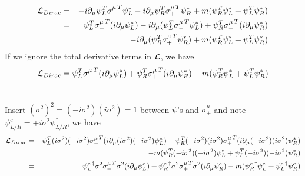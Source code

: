 \documentclass[11pt]{article}
\def\del{{\partial}}
\begin{document}
\section{ }

\begin{eqnarray}
    {\cal L}_{Dirac} &=& - i\del_\mu \psi_L^T{\sigma_-^\mu}^T \psi_L^*
    - i\del_\mu \psi_R^T {\sigma_+^\mu}^T \psi_R^*
    + m( \psi_R^T \psi_L^* + \psi_L^T \psi_R^* )  \\
    &=& \psi_L^T{\sigma_-^\mu}^T( i\del_\mu \psi_L^*) - i\del_\mu (\psi_L^T{\sigma_-^\mu}^T \psi_L^*)+  \psi_R^T {\sigma_+^\mu}^T(i\del_\mu \psi_R^*)\nonumber \\ &&- i\del_\mu (\psi_R^T {\sigma_+^\mu}^T \psi_R^*) 
    + m( \psi_R^T \psi_L^* + \psi_L^T \psi_R^* )     
\end{eqnarray}
If we ignore the total derivative terms in ${\cal L}$, we have 
\begin{eqnarray}
    {\cal L}_{Dirac}= \psi_L^T{\sigma_-^\mu}^T( i\del_\mu \psi_L^*)+\psi_R^T {\sigma_+^\mu}^T(i\del_\mu \psi_R^*) + m( \psi_R^T \psi_L^* + \psi_L^T \psi_R^* ) 
\end{eqnarray}

\section{ }
Insert $(\sigma^2)^2 = (-i\sigma^2)(i\sigma^2) = 1$ between $\psi$'s and $\sigma_\pm^\mu$ and note $\psi_{L/R}^c=\mp i\sigma^2 \psi_{L/R}^*$, we have
\begin{eqnarray}
    {\cal L}_{Dirac}&=& \psi_L^T(i\sigma^2)(-i\sigma^2){\sigma_-^\mu}^T( i\del_\mu (i\sigma^2)(-i\sigma^2)\psi_L^*)+\psi_R^T (-i\sigma^2)(i\sigma^2) {\sigma_+^\mu}^T(i\del_\mu (-i\sigma^2)(i\sigma^2) \psi_R^*) \nonumber \\ &&- m( \psi_R^T (-i\sigma^2)(-i\sigma^2)\psi_L^* + \psi_L^T (-i\sigma^2)(-i\sigma^2) \psi_R^* ) \\
    &=& {\psi_L^c}^\dagger \sigma^2 {\sigma_-^\mu}^T \sigma^2 ( i\del_\mu {\psi_L^c})+{\psi_R^c}^\dagger \sigma^2 {\sigma_+^\mu}^T \sigma^2(i\del_\mu {\psi_R^c}) - m( {\psi_R^c}^\dagger{\psi_L^c} + {\psi_L^c}^\dagger {\psi_R^c}) 
\end{eqnarray}
\end{document}
